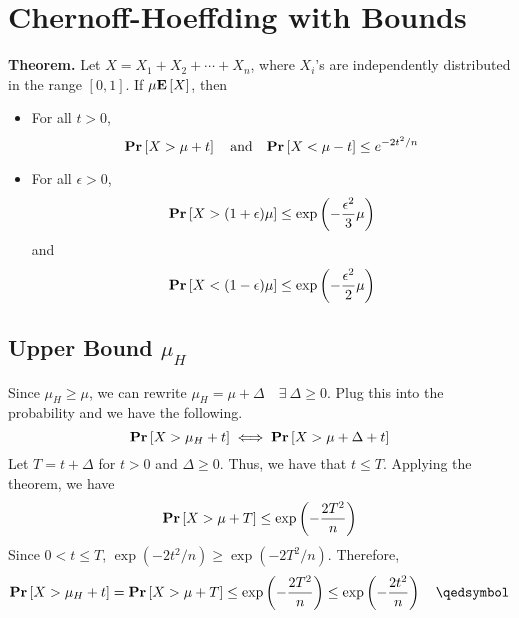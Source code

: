 \chapter{Chernoff-Hoeffding with Bounds}

\begin{tcolorbox}
\textbf{Theorem.} Let $X = X_1 + X_2 + \cdots + X_n$, where $X_i$'s are independently distributed in the range $[0, 1]$. If $\mu\mathbf{E}\left[X\right]$, then
\begin{itemize}
	\item For all $t > 0$, \[ \mathbf{Pr}\left[X > \mu + t\right]\quad\text{and}\quad \mathbf{Pr}\left[X < \mu - t\right] \leq e^{-2t^2/n} \]
	\item For all $\epsilon > 0$, \[ \mathbf{Pr}\left[X > (1 + \epsilon)\mu\right] \leq \exp\left(- \frac{\epsilon^2}{3}\mu\right) \]
		and \[ \mathbf{Pr}\left[X < (1 - \epsilon)\mu\right] \leq \exp\left(-\frac{\epsilon^2}{2}\mu\right) \]
\end{itemize}
\end{tcolorbox}

\section{Upper Bound $\mu_H$}

Since $\mu_H \geq \mu$, we can rewrite $\mu_H = \mu + \Delta\quad\exists\ \Delta \geq 0$. Plug this into the probability and we have the following.
\[ \mathbf{Pr}\left[X > \mu_H + t\right] \iff \mathbf{Pr}\left[X > \mu + \Delta + t\right] \]
Let $T = t + \Delta$ for $t > 0$ and $\Delta \geq 0$. Thus, we have that $t \leq T$. Applying the theorem, we have
\[ \mathbf{Pr}\left[X > \mu + T\right] \leq \exp\left(- \frac{2T^2}{n}\right) \]
Since $0 < t \leq T$, $\exp(-2t^2 / n) \geq \exp(-2T^2 / n)$. Therefore,
\[ \pr{X > \mu_H + t} = \pr{X > \mu + T} \leq \exp\left(- \frac{2T^2}{n}\right) \leq \exp\left(-\frac{2t^2}{n}\right) \quad \qedsymbol \]


